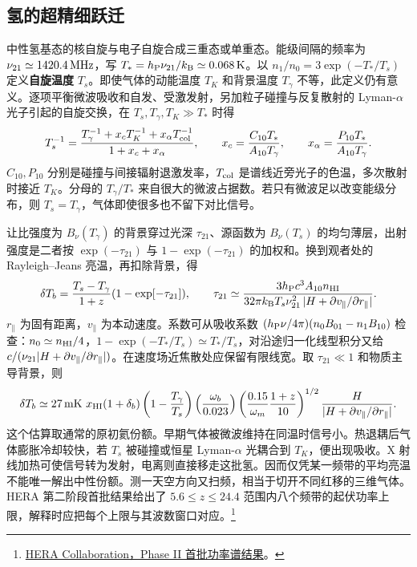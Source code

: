 \subsection{氢的超精细跃迁}

中性氢基态的核自旋与电子自旋合成三重态或单重态。能级间隔的频率为 $\nu_{21}\simeq1420.4\,{\rm MHz}$，写 $T_*=h_{\rm P}\nu_{21}/k_{\rm B}\simeq0.068\,{\rm K}$。以 $n_1/n_0=3\exp(-T_*/T_s)$ 定义\textbf{自旋温度} $T_s$。即使气体的动能温度 $T_K$ 和背景温度 $T_\gamma$ 不等，此定义仍有意义。逐项平衡微波吸收和自发、受激发射，另加粒子碰撞与反复散射的 Lyman-$\alpha$ 光子引起的自旋交换，在 $T_s,T_\gamma,T_K\gg T_*$ 时得
\[
 T_s^{-1}=\frac{T_\gamma^{-1}+x_cT_K^{-1}+x_\alpha T_{\rm col}^{-1}}
                {1+x_c+x_\alpha},\qquad
 x_c=\frac{C_{10}T_*}{A_{10}T_\gamma},\qquad
 x_\alpha=\frac{P_{10}T_*}{A_{10}T_\gamma}.
\]
$C_{10},P_{10}$ 分别是碰撞与间接辐射退激发率，$T_{\rm col}$ 是谱线近旁光子的色温，多次散射时接近 $T_K$。分母的 $T_\gamma/T_*$ 来自很大的微波占据数。若只有微波足以改变能级分布，则 $T_s=T_\gamma$，气体即使很多也不留下对比信号。

让比强度为 $B_\nu(T_\gamma)$ 的背景穿过光深 $\tau_{21}$、源函数为 $B_\nu(T_s)$ 的均匀薄层，出射强度是二者按 $\exp(-\tau_{21})$ 与 $1-\exp(-\tau_{21})$ 的加权和。换到观者处的 Rayleigh--Jeans 亮温，再扣除背景，得
\[
 \delta T_b=\frac{T_s-T_\gamma}{1+z}(1-\exp[-\tau_{21}]),\qquad
 \tau_{21}\simeq\frac{3h_{\rm P}c^3 A_{10}n_{\rm HI}}
 {32\pi k_{\rm B}T_s\nu_{21}^2\,|H+\partial v_\parallel/\partial r_\parallel|}.
\]
$r_\parallel$ 为固有距离，$v_\parallel$ 为本动速度。系数可从吸收系数 $(h_{\rm P}\nu/4\pi)(n_0B_{01}-n_1B_{10})$ 检查：$n_0\simeq n_{\rm HI}/4$，$1-\exp(-T_*/T_s)\simeq T_*/T_s$，对沿途归一化线型积分又给 $c/(\nu_{21}|H+\partial v_\parallel/\partial r_\parallel|)$。在速度场近焦散处应保留有限线宽。取 $\tau_{21}\ll1$ 和物质主导背景，则
\[
 \delta T_b\simeq 27\,{\rm mK}\ x_{\rm HI}(1+\delta_b)
 \left(1-\frac{T_\gamma}{T_s}\right)
 \left(\frac{\omega_b}{0.023}\right)
 \left(\frac{0.15}{\omega_m}\frac{1+z}{10}\right)^{1/2}
 \frac{H}{|H+\partial v_\parallel/\partial r_\parallel|}.
\]
这个估算取通常的原初氦份额。早期气体被微波维持在同温时信号小。热退耦后气体膨胀冷却较快，若 $T_s$ 被碰撞或恒星 Lyman-$\alpha$ 光耦合到 $T_K$，便出现吸收。X 射线加热可使信号转为发射，电离则直接移走这批氢。因而仅凭某一频带的平均亮温不能唯一解出中性份额。测一天空方向又扫频，相当于切开不同红移的三维气体。HERA 第二阶段首批结果给出了 $5.6\leq z\leq24.4$ 范围内八个频带的起伏功率上限，解释时应把每个上限与其波数窗口对应。\footnote{\href{https://arxiv.org/abs/2511.21289}{HERA Collaboration，Phase II 首批功率谱结果}。}

